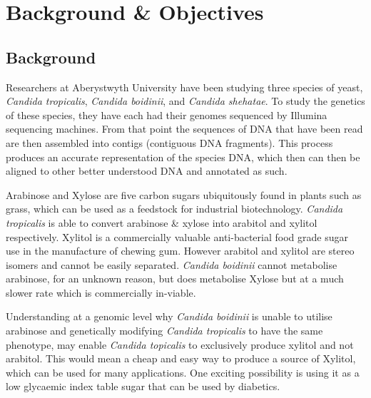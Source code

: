 \chapter{Background \& Objectives}

% 
% 
%    
%    

\section{Background}
Researchers at Aberystwyth University have been studying three species of yeast, \textit{Candida tropicalis}, \textit{Candida boidinii}, and \textit{Candida shehatae}. To study the genetics of these species, they have each had their genomes sequenced by Illumina sequencing machines. From that point the sequences of DNA that have been read are then assembled into contigs (contiguous DNA fragments). This process produces an accurate representation of the species DNA, which then can then be aligned to other better understood DNA and annotated as such.

Arabinose and Xylose are five carbon sugars ubiquitously found in plants such as grass, which can be used as a feedstock for industrial biotechnology. \textit{Candida tropicalis} is able to convert arabinose \& xylose into arabitol and xylitol respectively. Xylitol is a commercially valuable anti-bacterial food grade sugar use in the manufacture of chewing gum. However arabitol and xylitol are stereo isomers and cannot be easily separated. \textit{Candida boidinii} cannot metabolise arabinose, for an unknown reason, but does metabolise Xylose but at a much slower rate which is commercially in-viable.

Understanding at a genomic level why \textit{Candida boidinii} is unable to utilise arabinose and genetically modifying \textit{Candida tropicalis} to have the same phenotype, may enable \textit{Candida topicalis} to exclusively produce xylitol and not arabitol. This would mean a cheap and easy way to produce a source of Xylitol, which can be used for many applications. One exciting possibility is using it as a low glycaemic index table sugar that can be used by diabetics.

